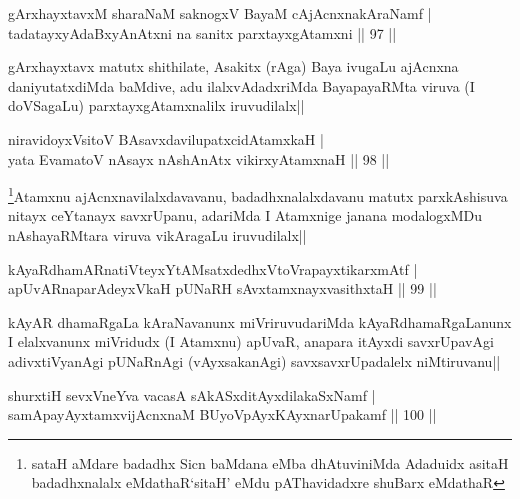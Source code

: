 
\begin{shl}
gArxhayxtavxM sharaNaM saknogxV BayaM cAjAcnxnakAraNamf |\\
tadatayxyAdaBxyAnAtxni na sanitx parxtayxgAtamxni \hfill || 97 ||
\end{shl}

\begin{artha}
gArxhayxtavx matutx shithilate, Asakitx (rAga) Baya ivugaLu ajAcnxna daniyutatxdiMda baMdive, adu ilalxvAdadxriMda BayapayaRMta viruva (I doVSagaLu) parxtayxgAtamxnalilx iruvudilalx||
\end{artha}


\begin{shl}
niravidoyxV\s sitoV BAsavxdavilupatxcidAtamxkaH |\\
yata EvamatoV nAsayx nAshAnAtx vikirxyA\s \s tamxnaH \hfill || 98 ||
\end{shl}

\begin{artha}
\footnote[1]{sataH aMdare badadhx Sicn baMdana eMba dhAtuviniMda Adaduidx asitaH badadhxnalalx eMdathaR`sitaH' eMdu pAThavidadxre shuBarx eMdathaR}Atamxnu ajAcnxnavilalxdavavanu, badadhxnalalxdavanu matutx parxkAshisuva nitayx ceYtanayx savxrUpanu, adariMda I Atamxnige janana modalogxMDu nAshayaRMtara viruva vikAragaLu iruvudilalx||
\end{artha}


\begin{shl}
kAyaRdhamARnatiVteyxYtAMsatxdedhxVtoVrapayxtikarxmAtf |\\
apUvARnaparAdeyxVkaH pUNaRH sAvxtamxnayxvasithxtaH \hfill || 99 ||
\end{shl}

\begin{artha}
kAyAR dhamaRgaLa kAraNavanunx miVriruvudariMda kAyaRdhamaRgaLanunx I elalxvanunx miVridudx (I Atamxnu) apUvaR, anapara itAyxdi savxrUpavAgi adivxtiVyanAgi pUNaRnAgi (vAyxsakanAgi) savxsavxrUpadalelx niMtiruvanu||
\end{artha}

\stext 

\begin{shl}
shurxtiH sevxVneYva vacasA sAkASxditAyxdilakaSxNamf |\\
samApayAyx\s \s tamxvijAcnxnaM BUyoV\s pAyxKAyxnarUpakamf \hfill || 100 ||
\end{shl}

